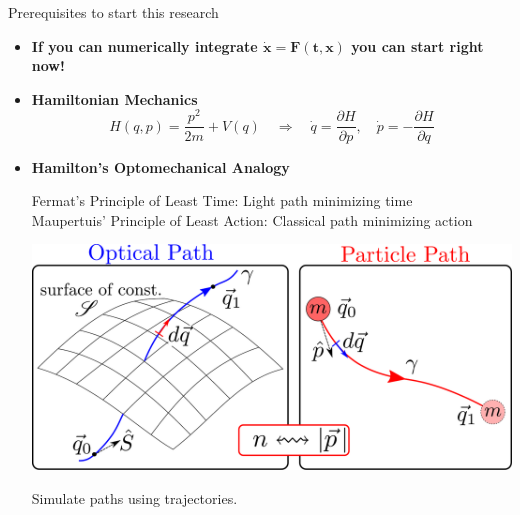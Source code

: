 \documentclass[fleqn,t,serif,10pt,aspectratio=141,compress]{beamer}
\begin{document}
\begin{frame}{Prerequisites to start this research}
    \begin{itemize}
        \item \textbf{If you can numerically integrate $\bm{\dot{x}=F(t,x)}$ you can start right now!}
        \item \textbf{Hamiltonian Mechanics}
            \begin{equation*}
                H(q,p)=\frac{p^2}{2m}+V(q)
                \quad \Rightarrow \quad
                \dot{q}=\frac{\partial H}{\partial p}, \quad
                \dot{p}=-\frac{\partial H}{\partial q}
            \end{equation*}
        \item \textbf{Hamilton's Optomechanical Analogy}

            Fermat's Principle of Least Time: Light path minimizing time \\
            Maupertuis' Principle of Least Action: Classical path minimizing action
            \begin{center}
                \includegraphics[width=.7\textwidth]{Opto-Mechanical-Analogy.pdf}

                \begin{tcolorbox}[
                colframe=cyan,
                ]
                    \centering
                    Simulate  paths using  trajectories.
                \end{tcolorbox}
            \end{center}
    \end{itemize}
\end{frame}
\end{document}
